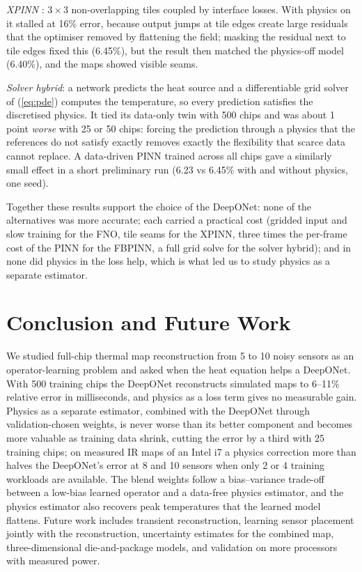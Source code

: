 \documentclass[journal]{IEEEtran}
\begin{document}
\emph{XPINN} \cite{jagtap2020xpinn}: $3\times3$ non-overlapping tiles coupled by interface losses.
With physics on it stalled at 16\% error, because output jumps at tile edges create large residuals that the optimiser removed by flattening the field; masking the residual next to tile edges fixed this (6.45\%), but the result then matched the physics-off model (6.40\%), and the maps showed visible seams.

\emph{Solver hybrid}: a network predicts the heat source and a differentiable grid solver of (\ref{eq:pde}) computes the temperature, so every prediction satisfies the discretised physics.
It tied its data-only twin with 500 chips and was about 1 point \emph{worse} with 25 or 50 chips: forcing the prediction through a physics that the references do not satisfy exactly removes exactly the flexibility that scarce data cannot replace.
A data-driven PINN trained across all chips gave a similarly small effect in a short preliminary run (6.23 vs 6.45\% with and without physics, one seed).

Together these results support the choice of the DeepONet: none of the alternatives was more accurate; each carried a practical cost (gridded input and slow training for the FNO, tile seams for the XPINN, three times the per-frame cost of the PINN for the FBPINN, a full grid solve for the solver hybrid); and in none did physics in the loss help, which is what led us to study physics as a separate estimator.

\section{Conclusion and Future Work}\label{sec:conclusion}
We studied full-chip thermal map reconstruction from 5 to 10 noisy sensors as an operator-learning problem and asked when the heat equation helps a DeepONet.
With 500 training chips the DeepONet reconstructs simulated maps to 6--11\% relative error in milliseconds, and physics as a loss term gives no measurable gain.
Physics as a separate estimator, combined with the DeepONet through validation-chosen weights, is never worse than its better component and becomes more valuable as training data shrink, cutting the error by a third with 25 training chips; on measured IR maps of an Intel i7 a physics correction more than halves the DeepONet's error at 8 and 10 sensors when only 2 or 4 training workloads are available.
The blend weights follow a bias--variance trade-off between a low-bias learned operator and a data-free physics estimator, and the physics estimator also recovers peak temperatures that the learned model flattens.
Future work includes transient reconstruction, learning sensor placement jointly with the reconstruction, uncertainty estimates for the combined map, three-dimensional die-and-package models, and validation on more processors with measured power.
\end{document}
